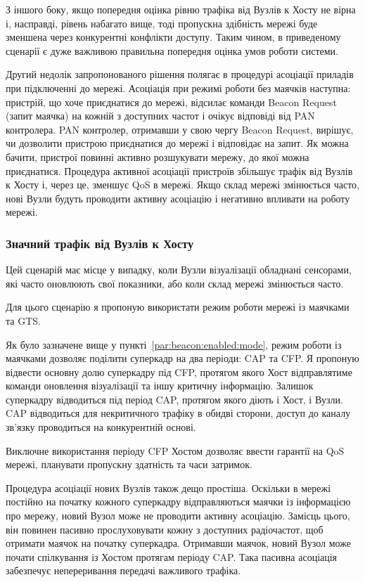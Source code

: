 \documentclass[a4paper,ukrainian,utf8,nocolumnsxix,floatsection]{eskdtext}
\renewcommand\paragraph{\subsubsection}
\begin{document}
З іншого боку, якщо попередня оцінка рівню трафіка від Вузлів к Хосту не вірна і, насправді, рівень набагато вище, тоді пропускна здібність мережі буде зменшена через конкурентні конфлікти доступу. Таким чином, в приведеному сценарії є дуже важливою правильна попередня оцінка умов роботи системи.

Другий недолік запропонованого рішення полягає в процедурі асоціації приладів при підключенні до мережі. Асоціація при режимі роботи без маячків наступна: пристрій, що хоче приєднатися до мережі, відсилає команди Beacon Request (запит маячка) на кожній з доступних частот і очікує відповіді від PAN контролера. PAN контролер, отримавши  у свою чергу Beacon Request, вирішує, чи дозволити пристрою приєднатися до мережі і відповідає на запит. Як можна бачити, пристрої повинні активно розшукувати мережу, до якої можна приєднатися. Процедура активної асоціації пристроїв збільшує трафік від Вузлів к Хосту і, через це, зменшує QoS в мережі. Якщо склад мережі змінюється часто, нові Вузли будуть проводити активну асоціацію і негативно впливати на роботу мережі.

\paragraph{Значний трафік від Вузлів к Хосту}
\label{par:low:ntht}

Цей сценарій має місце у випадку, коли Вузли візуалізації обладнані сенсорами, які часто  оновлюють свої показники, або коли склад мережі змінюється часто.

Для цього сценарію я пропоную використати режим роботи мережі із маячками та GTS.

Як було зазначене вище у пункті~\ref{par:beacon:enabled:mode}, режим роботи із маячками дозволяє поділити суперкадр на два періоди: CAP та CFP. Я пропоную відвести основну долю суперкадру під CFP, протягом якого Хост відправлятиме команди оновлення візуалізації та іншу критичну інформацію. Залишок суперкадру відводиться під період CAP, протягом якого діють і Хост, і Вузли. CAP відводиться для некритичного трафіку в обидві сторони, доступ до каналу зв’язку проводиться на конкурентній основі. 

Виключне використання періоду CFP Хостом дозволяє ввести гарантії на QoS мережі, планувати пропускну здатність та часи затримок. 

Процедура асоціації нових Вузлів також дещо простіша. Оскільки в мережі постійно на початку кожного суперкадру відправляються маячки із інформацією про мережу, новий Вузол може не проводити активну асоціацію. Замісць цього, він повинен пасивно прослуховувати кожну з доступних радіочастот, щоб отримати маячок на початку суперкадра. Отримавши маячок, новий Вузол може почати спілкування із Хостом протягам періоду CAP. Така пасивна асоціація забезпечує непереривання передачі важливого трафіка.
\end{document}
